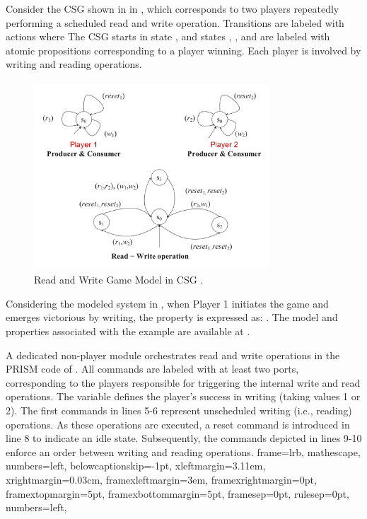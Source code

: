 \begin{example}
\label{exp:csg:architecture}   
Consider the CSG shown in  in \cite{BAOUYA2024101161}, which corresponds to two players repeatedly performing a scheduled read and write operation. Transitions are labeled with actions where The CSG starts in state , and states , , and  are labeled with atomic propositions corresponding to a player winning. Each player is involved by writing and reading operations.
\noindent
\begin{figure}[!htb]
    \centering
      \includegraphics[width=250pt, height =200pt]{examplecsg.pdf}
    \caption{Read and Write Game Model in CSG \cite{BAOUYA2024101161}.}
    \label{fig:even:odds}
\end{figure} 


Considering the modeled system in , when Player 1 initiates the game and emerges victorious by writing, the property is expressed as: . The model and properties associated with the example are available at \cite{BAOUYA2024101161}. 


A dedicated non-player module orchestrates read and write operations in the PRISM code of . All commands are labeled with at least two ports, corresponding to the players responsible for triggering the internal write and read operations. The  variable defines the player's success in writing (taking values 1 or 2).
The first commands in lines 5-6 represent unscheduled writing (i.e., reading) operations. As these operations are executed, a reset command is introduced in line 8 to indicate an idle state. Subsequently, the commands depicted in lines 9-10 enforce an order between writing and reading operations.  
{
	frame=lrb,         
	mathescape,
	numbers=left,
	belowcaptionskip=-1pt,
    xleftmargin=3.11em,
		xrightmargin=0.03cm,
    framexleftmargin=3em,
	framexrightmargin=0pt,
	framextopmargin=5pt,
	framexbottommargin=5pt,
	framesep=0pt,
	rulesep=0pt,
	numbers=left,
}
    

\end{example}
